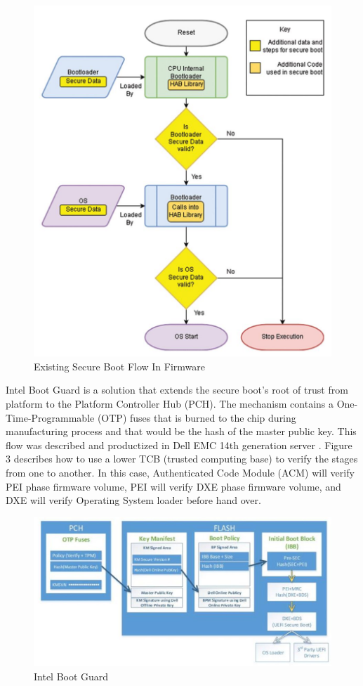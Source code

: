 \documentclass[]{rsos}%
\begin{document}
\begin{figure}[H]
	\centering
	\includegraphics[width=1\textwidth]{figs/ExistingSecureBootFlowInFirmware.JPG}
	\caption{Existing Secure Boot Flow In Firmware \cite{R5:15}}
\end{figure}

Intel Boot Guard is a solution that extends the secure boot’s root of trust from platform to the Platform Controller Hub (PCH). The mechanism contains a One-Time-Programmable (OTP) fuses that is burned to the chip during manufacturing process and that would be the hash of the master public key. This flow was described and productized in Dell EMC 14th generation server  \cite{R5:14} . Figure 3 describes how to use a lower TCB (trusted computing base) to verify the stages from one to another. In this case, Authenticated Code Module (ACM) will verify PEI phase firmware volume, PEI will verify DXE phase firmware volume, and DXE will verify Operating System loader before hand over.

\begin{figure}[H]
	\centering
	\includegraphics[width=1\textwidth]{figs/IntelBootGuard.JPG}
	\caption{Intel Boot Guard \cite{R5:14}}
\end{figure}
\end{document}
